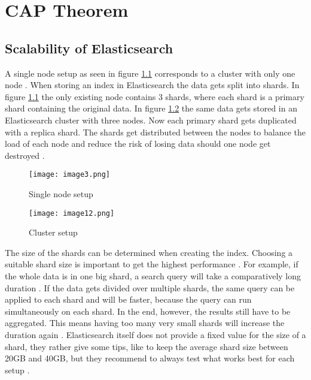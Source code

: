 \chapter{CAP Theorem}

\section{Scalability of Elasticsearch}
A single node setup as seen in figure \ref{fig:singlenodesetup} corresponds to a cluster with only one node \autocite{elastic2019_10}. When storing an index in Elasticsearch the data gets split into shards. In figure \ref{fig:singlenodesetup} the only existing node contains 3 shards, where each shard is a primary shard containing the original data. In figure \ref{fig:clustersetup} the same data gets stored in an Elasticsearch cluster with three nodes. Now each primary shard gets duplicated with a replica shard. The shards get distributed between the nodes to balance the load of each node and reduce the risk of losing data should one node get destroyed \autocite{elastic2019_10}.

\begin{figure}[ht]
    \centering
    \texttt{[image: image3.png]}
    \caption{Single node setup \autocite{elastic2019_09}}
    \label{fig:singlenodesetup}
\end{figure}

\begin{figure}[ht]
    \centering
    \texttt{[image: image12.png]}
    \caption{Cluster setup \autocite{elastic2019_09}}
    \label{fig:clustersetup}
\end{figure}

The size of the shards can be determined when creating the index. Choosing a suitable shard size is important to get the highest performance \autocite{dahlqvistc2018}. For example, if the whole data is in one big shard, a search query will take a comparatively long duration \autocite{dahlqvistc2018}. If the data gets divided over multiple shards, the same query can be applied to each shard and will be faster, because the query can run simultaneously on each shard. In the end, however, the results still have to be aggregated. This means having too many very small shards will increase the duration again \autocite{dahlqvistc2018}. Elasticsearch itself does not provide a fixed value for the size of a shard, they rather give some tips, like to keep the average shard size between 20GB and 40GB, but they recommend to always test what works best for each setup \autocite{dahlqvistc2018}.

